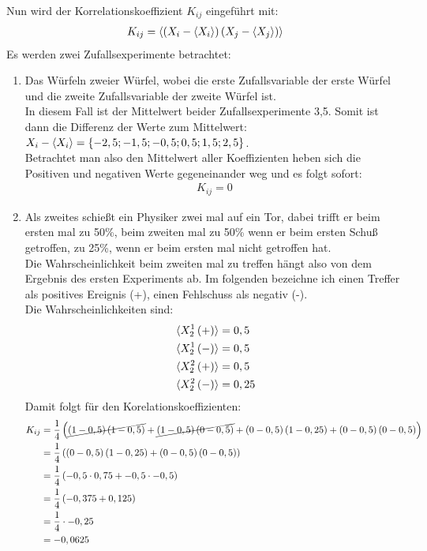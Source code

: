 \documentclass[11pt, ngerman, fleqn, DIV=15, headinclude]{scrartcl}
\begin{document}
\subsubsection{}
Nun wird der Korrelationskoeffizient $K_{ij}$ eingeführt mit:
\begin{align*}
	K_{ij} = \braket{\left( X_i - \braket{X_i} \right)\left( X_j - \braket{X_j} \right)}
\end{align*}
Es werden zwei Zufallsexperimente betrachtet:
\begin{enumerate}
	\item
	Das Würfeln zweier Würfel, wobei die erste Zufallsvariable der erste Würfel und die zweite Zufallsvariable der zweite Würfel ist.\\
	In diesem Fall ist der Mittelwert beider Zufallsexperimente 3,5. Somit ist dann die Differenz der Werte zum Mittelwert: $X_i - \braket{X_i} = \{-2,5;-1,5;-0,5;0,5;1,5;2,5\}$.\\
	Betrachtet man also den Mittelwert aller Koeffizienten heben sich die Positiven und negativen Werte gegeneinander weg und es folgt sofort:
	\begin{align*}
		K_{ij} = 0
	\end{align*}
	\item
	Als zweites schießt ein Physiker zwei mal auf ein Tor, dabei trifft er beim ersten mal zu 50\%, beim zweiten mal zu 50\% wenn er beim ersten Schuß getroffen, zu 25\%, wenn er beim ersten mal nicht getroffen hat.\\
	Die Wahrscheinlichkeit beim zweiten mal zu treffen hängt also von dem Ergebnis des ersten Experiments ab. Im folgenden bezeichne ich einen Treffer als positives Ereignis (+), einen Fehlschuss als negativ (-).\\
	Die Wahrscheinlichkeiten sind:
	\begin{align*}
		&\braket{X_2^1\left( + \right)} = 0,5\\
		&\braket{X_2^1\left( - \right)} = 0,5\\
		&\braket{X_2^2\left( + \right)} = 0,5\\
		&\braket{X_2^2\left( - \right)} = 0,25
	\end{align*}
	Damit folgt für den Korelationskoeffizienten:
	\begin{align*}
		K_{ij} 	&= \frac14\left( \cancel{\left( 1 - 0,5 \right)\left( 1 - 0,5 \right)} + \cancel{\left( 1 - 0,5 \right)\left( 0 - 0,5 \right)} + \left( 0 - 0,5 \right)\left( 1 - 0,25 \right) + \left( 0 - 0,5 \right)\left( 0 - 0,5 \right) \right)\\
				&= \frac14\left( \left( 0 - 0,5 \right)\left( 1 - 0,25 \right) + \left( 0 - 0,5 \right)\left( 0 - 0,5 \right) \right)\\
				&= \frac14\left( -0,5\cdot0,75 + -0,5\cdot-0,5 \right)\\
				&= \frac14\left( -0,375 + 0,125 \right)\\
				&= \frac14\cdot-0,25\\
				&= -0,0625
	\end{align*}
\end{enumerate}
\end{document}
